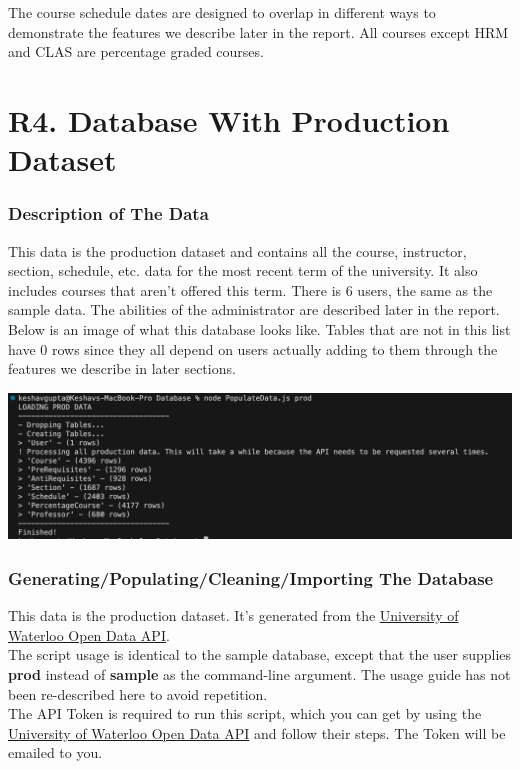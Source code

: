 \documentclass[12pt, a4paper]{article}
\begin{document}
The course schedule dates are designed to overlap in different ways to demonstrate the features we describe later in the report. All courses except HRM and CLAS are percentage graded courses.
\section*{R4. Database With Production Dataset}
\label{sec:R4}
\subsubsection*{Description of The Data}
This data is the production dataset and contains all the course, instructor, section, schedule, etc. data for the most recent term of the university. It also includes courses that aren't offered this term. There is 6 users, the same as the sample data. The abilities of the administrator are described later in the report.\\

Below is an image of what this database looks like. Tables that are not in this list have 0 rows since they all depend on users actually adding to them through the features we describe in later sections.
\begin{center}
    \includegraphics[width=\textwidth]{proddata}
\end{center}
\subsubsection*{Generating/Populating/Cleaning/Importing The Database}
This data is the production dataset. It's generated from the \href{https://openapi.data.uwaterloo.ca/api-docs/index.html}{University of Waterloo Open Data API}.\\

The script usage is identical to the sample database, except that the user supplies \textbf{prod} instead of \textbf{sample} as the command-line argument. The usage guide has not been re-described here to avoid repetition.\\

The API Token is required to run this script, which you can get by using the \href{https://openapi.data.uwaterloo.ca/api-docs/index.html}{University of Waterloo Open Data API} and follow their steps. The Token will be emailed to you.\\
\end{document}
